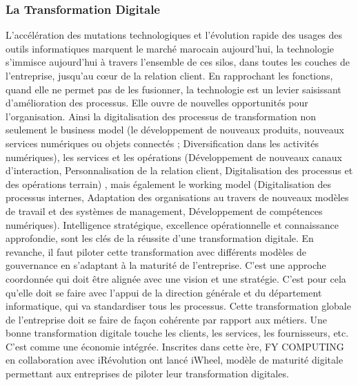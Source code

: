 \documentclass[a4paper,11pt,oneside]{report}
\begin{document}
\subsubsection*{La Transformation Digitale}
L’accélération des mutations technologiques et l’évolution rapide des usages des outils informatiques marquent le marché marocain aujourd'hui, la technologie s’immisce aujourd’hui à travers l’ensemble de ces silos, dans toutes les couches de l’entreprise, jusqu’au cœur de la relation client. En rapprochant les fonctions, quand elle ne permet pas de les fusionner, la technologie est un levier saisissant d’amélioration des processus. Elle ouvre de nouvelles opportunités pour l’organisation. Ainsi la digitalisation des processus de transformation non seulement le business model (le développement de nouveaux produits, nouveaux services numériques ou objets connectés ; Diversification dans les activités numériques), les services et les opérations (Développement de nouveaux canaux d’interaction, Personnalisation de la relation client, Digitalisation des processus et des opérations terrain) , mais également le working model (Digitalisation des processus internes, Adaptation des organisations au travers de nouveaux modèles de travail et des systèmes de management, Développement de compétences numériques).
\newline
\newline
Intelligence stratégique, excellence opérationnelle et connaissance approfondie, sont les clés de la réussite d’une transformation digitale. En revanche, il faut piloter cette transformation avec différents modèles de gouvernance en s’adaptant à la maturité de l’entreprise. C’est une approche coordonnée qui doit être alignée avec une vision et une stratégie. C’est pour cela qu’elle doit se faire avec l’appui de la direction générale et du département informatique, qui va standardiser tous les processus. Cette transformation globale de l’entreprise doit se faire de façon cohérente par rapport aux métiers. Une bonne transformation digitale touche les clients, les services, les fournisseurs, etc. C’est comme une économie intégrée.
\newline
\newline
Inscrites dans cette ère, FY COMPUTING en collaboration avec iRévolution ont lancé iWheel, modèle de maturité digitale permettant aux entreprises de piloter leur transformation digitales.
\end{document}
